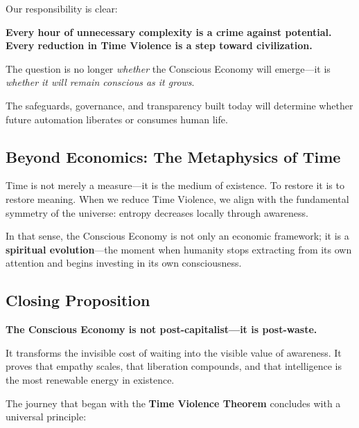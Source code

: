 Our responsibility is clear:

\begin{keyproposition}
\textbf{Every hour of unnecessary complexity is a crime against potential.}\\
\textbf{Every reduction in Time Violence is a step toward civilization.}
\end{keyproposition}

The question is no longer \textit{whether} the Conscious Economy will emerge—it is \textit{whether it will remain conscious as it grows}.

The safeguards, governance, and transparency built today will determine whether future automation liberates or consumes human life.

\subsection{Beyond Economics: The Metaphysics of Time}
\label{sec:metaphysics}

Time is not merely a measure—it is the medium of existence. To restore it is to restore meaning. When we reduce Time Violence, we align with the fundamental symmetry of the universe: entropy decreases locally through awareness.

In that sense, the Conscious Economy is not only an economic framework; it is a \textbf{spiritual evolution}—the moment when humanity stops extracting from its own attention and begins investing in its own consciousness.

\subsection{Closing Proposition}
\label{sec:closing-proposition}

\begin{keyproposition}
\textbf{The Conscious Economy is not post-capitalist—it is post-waste.}
\end{keyproposition}

It transforms the invisible cost of waiting into the visible value of awareness. It proves that empathy scales, that liberation compounds, and that intelligence is the most renewable energy in existence.

The journey that began with the \textbf{Time Violence Theorem} concludes with a universal principle:

